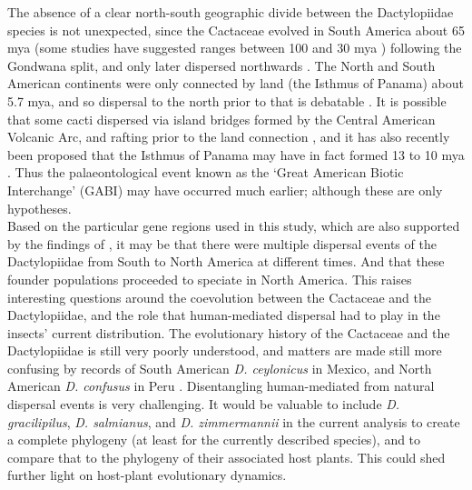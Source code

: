 The absence of a clear north-south geographic divide between the Dactylopiidae species is not unexpected, since the Cactaceae evolved in South America about 65 mya (some studies have suggested ranges between 100 \citep{mauseth1990continental} and 30 mya \citep{hershkovitz1997evolutionary}) following the Gondwana split, and only later dispersed northwards \citep{Anderson2001}. The North and South American continents were only connected by land (the Isthmus of Panama) about 5.7 mya, and so dispersal to the north prior to that is debatable \citep{Anderson2001, portillo2007biogeography}.
It is possible that some cacti dispersed via island bridges formed by the Central American Volcanic Arc, and rafting prior to the land connection \citep{Anderson2001}, and it has also recently been proposed that the Isthmus of Panama may have in fact formed 13 to 10 mya \citep{montes2015middle}. Thus the palaeontological event known as the `Great American Biotic Interchange' (GABI) may have occurred much earlier; although these are only hypotheses. \\
Based on the particular gene regions used in this study, which are also supported by the findings of \citet{Ramirez-Puebla2010MolecularBacteria}, it may be that there were multiple dispersal events of the Dactylopiidae from South to North America at different times. And that these founder populations proceeded to speciate in North America.
This raises interesting questions around the coevolution between the Cactaceae and the Dactylopiidae, and the role that human-mediated dispersal had to play in the insects' current distribution.
The evolutionary history of the Cactaceae and the Dactylopiidae is still very poorly understood, and matters are made still more confusing by records of South American \textit{D. ceylonicus} in Mexico, and North American \textit{D. confusus} in Peru \citep{portillo2007biogeography}. Disentangling human-mediated from natural dispersal events is very challenging.
It would be valuable to include \textit{D. gracilipilus}, \textit{D. salmianus}, and \textit{D. zimmermannii} in the current analysis to create a complete phylogeny (at least for the currently described species), and to compare that to the phylogeny of their associated host plants. This could shed further light on host-plant evolutionary dynamics.

